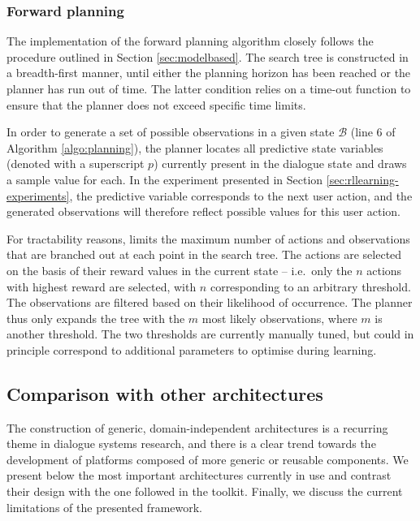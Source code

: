 \subsubsection*{Forward planning}

The implementation of the forward planning algorithm closely follows the procedure outlined in Section \ref{sec:modelbased}.  The search tree is constructed in a breadth-first manner, until either the planning horizon has been reached or the planner has run out of time.  The latter condition relies on a time-out function to ensure that the planner does not exceed specific time limits.

In order to generate a set of possible observations in a given state $\mathcal{B}$ (line 6 of Algorithm \ref{algo:planning}), the planner locates all predictive state variables (denoted with a superscript $p$) currently present in the dialogue state and draws a sample value for each.  In the experiment presented in Section \ref{sec:rllearning-experiments}, the predictive variable corresponds to the next user action, and the generated observations will therefore reflect possible values for this user action.

For tractability reasons, \opendial{} limits the maximum number of actions and observations that are branched out at each point in the search tree.  The actions are selected on the basis of their reward values in the current state -- i.e.\ only the $n$ actions with highest reward are selected, with $n$ corresponding to an arbitrary threshold. The observations are filtered based on their likelihood of occurrence.  The planner thus only expands the tree with the $m$ most likely observations, where $m$ is another threshold. The two thresholds are currently manually tuned, but could in principle correspond to additional parameters to optimise during learning. 

\subsection{Comparison with other architectures}
\label{sec:archi-comparison}

The construction of generic, domain-independent architectures is a recurring theme in dialogue systems research, and there is a clear trend towards the development of platforms composed of more generic or reusable components. We present below the most important architectures currently in use and contrast their design with the one followed in the \opendial{} toolkit. Finally, we discuss the current limitations of the presented framework.

